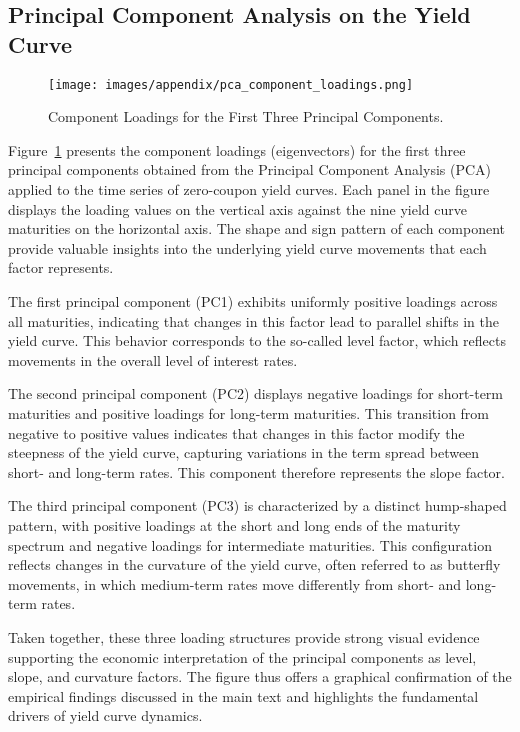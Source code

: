 \subsection{Principal Component Analysis on the Yield Curve}
\begin{figure}[H]
	\centering
	\texttt{[image: images/appendix/pca\_component\_loadings.png]}
	\caption{Component Loadings for the First Three Principal Components.}
	\label{fig:pca_loadings}
\end{figure}

Figure~\ref{fig:pca_loadings} presents the component loadings (eigenvectors) for the first three principal components obtained from the Principal Component Analysis (PCA) applied to the time series of zero-coupon yield curves. Each panel in the figure displays the loading values on the vertical axis against the nine yield curve maturities on the horizontal axis. The shape and sign pattern of each component provide valuable insights into the underlying yield curve movements that each factor represents.

The first principal component (PC1) exhibits uniformly positive loadings across all maturities, indicating that changes in this factor lead to parallel shifts in the yield curve. This behavior corresponds to the so-called level factor, which reflects movements in the overall level of interest rates.

The second principal component (PC2) displays negative loadings for short-term maturities and positive loadings for long-term maturities. This transition from negative to positive values indicates that changes in this factor modify the steepness of the yield curve, capturing variations in the term spread between short- and long-term rates. This component therefore represents the slope factor.

The third principal component (PC3) is characterized by a distinct hump-shaped pattern, with positive loadings at the short and long ends of the maturity spectrum and negative loadings for intermediate maturities. This configuration reflects changes in the curvature of the yield curve, often referred to as butterfly movements, in which medium-term rates move differently from short- and long-term rates.

Taken together, these three loading structures provide strong visual evidence supporting the economic interpretation of the principal components as level, slope, and curvature factors. The figure thus offers a graphical confirmation of the empirical findings discussed in the main text and highlights the fundamental drivers of yield curve dynamics.

